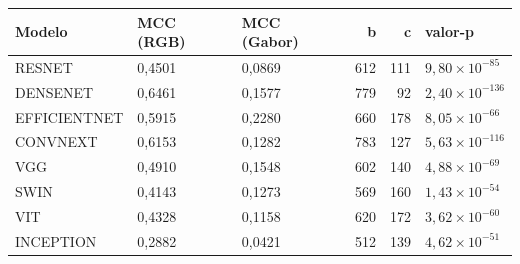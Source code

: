 \begin{tabular}{lllrrl}
\toprule
Modelo & MCC (RGB) & MCC (Gabor) & b & c & valor-p \\
\midrule
RESNET & 0,4501 & 0,0869 & 612 & 111 & $9,80 \times 10^{-85}$ \\
DENSENET & 0,6461 & 0,1577 & 779 & 92 & $2,40 \times 10^{-136}$ \\
EFFICIENTNET & 0,5915 & 0,2280 & 660 & 178 & $8,05 \times 10^{-66}$ \\
CONVNEXT & 0,6153 & 0,1282 & 783 & 127 & $5,63 \times 10^{-116}$ \\
VGG & 0,4910 & 0,1548 & 602 & 140 & $4,88 \times 10^{-69}$ \\
SWIN & 0,4143 & 0,1273 & 569 & 160 & $1,43 \times 10^{-54}$ \\
VIT & 0,4328 & 0,1158 & 620 & 172 & $3,62 \times 10^{-60}$ \\
INCEPTION & 0,2882 & 0,0421 & 512 & 139 & $4,62 \times 10^{-51}$ \\
\bottomrule
\end{tabular}

